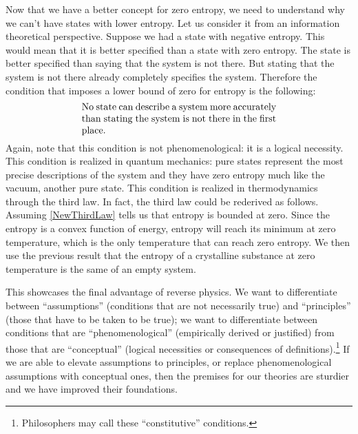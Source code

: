 \documentclass[10pt,twocolumn, nofootinbib]{revtex4-2}
\begin{document}
Now that we have a better concept for zero entropy, we need to understand why we can't have states with lower entropy. Let us consider it from an information theoretical perspective. Suppose we had a state with negative entropy. This would mean that it is better specified than a state with zero entropy. The state is better specified than saying that the system is not there. But stating that the system is not there already completely specifies the system. Therefore the condition that imposes a lower bound of zero for entropy is the following:
\begin{align}\label{NewThirdLaw}
	\parbox{2.8in}{No state can describe a system more accurately than stating the system is not there in the first place.}
\end{align}
Again, note that this condition is not phenomenological: it is a logical necessity. This condition is realized in quantum mechanics: pure states represent the most precise descriptions of the system and they have zero entropy much like the vacuum, another pure state. This condition is realized in thermodynamics through the third law. In fact, the third law could be rederived as follows. Assuming \eqref{NewThirdLaw} tells us that entropy is bounded at zero. Since the entropy is a convex function of energy, entropy will reach its minimum at zero temperature, which is the only temperature that can reach zero entropy. We then use the previous result that the entropy of a crystalline substance at zero temperature is the same of an empty system.

This showcases the final advantage of reverse physics. We want to differentiate between ``assumptions'' (conditions that are not necessarily true) and ``principles'' (those that have to be taken to be true); we want to differentiate between conditions that are ``phenomenological'' (empirically derived or justified) from those that are ``conceptual'' (logical necessities or consequences of definitions).\footnote{Philosophers may call these ``constitutive'' conditions.} If we are able to elevate assumptions to principles, or replace phenomenological assumptions with conceptual ones, then the premises for our theories are sturdier and we have improved their foundations.
\end{document}
